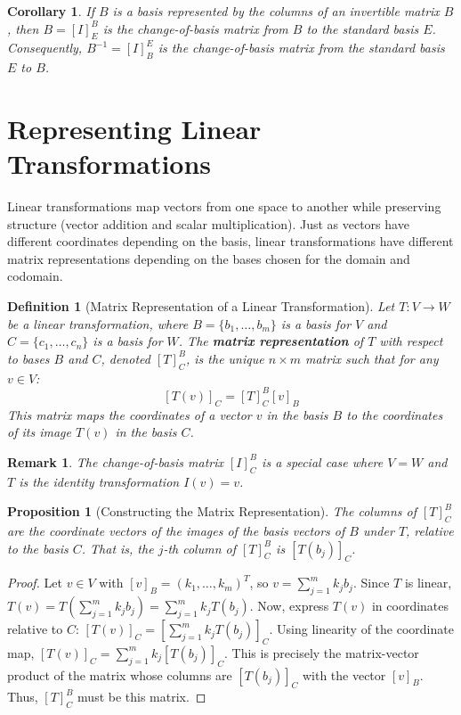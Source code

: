 \documentclass[11pt, a4paper]{article}
\theoremstyle{mydefinitionstyle}
\newtheorem{definition}{Definition}[section]
\newtheorem{remark}{Remark}[section]
\theoremstyle{mytheoremstyle}
\newtheorem{proposition}{Proposition}[section]
\newtheorem{corollary}{Corollary}[section]
\begin{document}
\begin{corollary} \label{cor:std_basis_change}
    If $B$ is a basis represented by the columns of an invertible matrix $B$, then $B = [I]_E^B$ is the change-of-basis matrix from $B$ to the standard basis $E$. Consequently, $B^{-1} = [I]_B^E$ is the change-of-basis matrix from the standard basis $E$ to $B$.
\end{corollary}


\section{Representing Linear Transformations}

Linear transformations map vectors from one space to another while preserving structure (vector addition and scalar multiplication). Just as vectors have different coordinates depending on the basis, linear transformations have different matrix representations depending on the bases chosen for the domain and codomain.

\begin{definition}[Matrix Representation of a Linear Transformation] \label{def:matrix_rep}
    Let $T: V \to W$ be a linear transformation, where $B = \{b_1, \dots, b_m\}$ is a basis for $V$ and $C = \{c_1, \dots, c_n\}$ is a basis for $W$. The \textbf{matrix representation} of $T$ with respect to bases $B$ and $C$, denoted $[T]_C^B$, is the unique $n \times m$ matrix such that for any $v \in V$:
    \[ [T(v)]_C = [T]_C^B [v]_B \]
    This matrix maps the coordinates of a vector $v$ in the basis $B$ to the coordinates of its image $T(v)$ in the basis $C$.
\end{definition}

\begin{remark}
    The change-of-basis matrix $[I]_C^B$ is a special case where $V=W$ and $T$ is the identity transformation $I(v) = v$.
\end{remark}

\begin{proposition}[Constructing the Matrix Representation] \label{prop:matrix_rep_cols}
    The columns of $[T]_C^B$ are the coordinate vectors of the images of the basis vectors of $B$ under $T$, relative to the basis $C$. That is, the $j$-th column of $[T]_C^B$ is $[T(b_j)]_C$.
\end{proposition}
\begin{proof}
    Let $v \in V$ with $[v]_B = (k_1, \dots, k_m)^T$, so $v = \sum_{j=1}^m k_j b_j$.
    Since $T$ is linear, $T(v) = T(\sum_{j=1}^m k_j b_j) = \sum_{j=1}^m k_j T(b_j)$.
    Now, express $T(v)$ in coordinates relative to $C$:
    $[T(v)]_C = [\sum_{j=1}^m k_j T(b_j)]_C$. Using linearity of the coordinate map,
    $[T(v)]_C = \sum_{j=1}^m k_j [T(b_j)]_C$.
    This is precisely the matrix-vector product of the matrix whose columns are $[T(b_j)]_C$ with the vector $[v]_B$. Thus, $[T]_C^B$ must be this matrix.
\end{proof}
\end{document}
